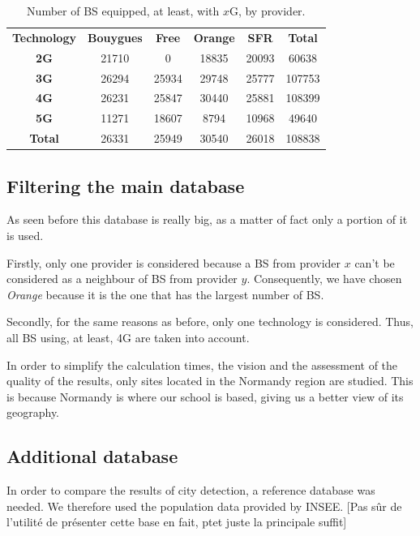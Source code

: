 \documentclass[lettersize,journal,english]{IEEEtran}
\begin{document}
        \begin{table}
            \centering
            \caption{Number of BS equipped, at least, with $x$G, by provider.}
            \label{table:techno_numbers}
            \begin{tabular}{cccccc}
                \toprule
                \textbf{Technology} & \textbf{Bouygues} & \textbf{Free} & \textbf{Orange} & \textbf{SFR} & \textbf{Total} \\
                \cmidrule(lr){1-6}
                \textbf{2G} & 21710 & 0 & 18835 & 20093 & 60638 \\
                \textbf{3G} & 26294 & 25934 & 29748 & 25777 & 107753 \\
                \textbf{4G} & 26231 & 25847 & 30440 & 25881 & 108399 \\
                \textbf{5G} & 11271 & 18607 & 8794 & 10968 & 49640 \\
                \textbf{Total} & 26331 & 25949 & 30540 & 26018 & 108838 \\
                \bottomrule
            \end{tabular}
        \end{table}

    \subsection{Filtering the main database}
        As seen before this database is really big, as a matter of fact only a portion of it is used.

        Firstly, only one provider is considered because a BS from provider $x$ can't be considered as a neighbour of BS from provider $y$.
        Consequently, we have chosen \emph{Orange} because it is the one that has the largest number of BS.

        Secondly, for the same reasons as before, only one technology is considered. Thus, all BS using, at least, 4G are taken into account.

        In order to simplify the calculation times, the vision and the assessment of the quality of the results, only sites located in the Normandy region are studied.
        This is because Normandy is where our school is based, giving us a better view of its geography.

    \subsection{Additional database}
        In order to compare the results of city detection, a reference database was needed. We therefore used the population data provided by INSEE.
        [Pas sûr de l'utilité de présenter cette base en fait, ptet juste la principale suffit]
\end{document}
